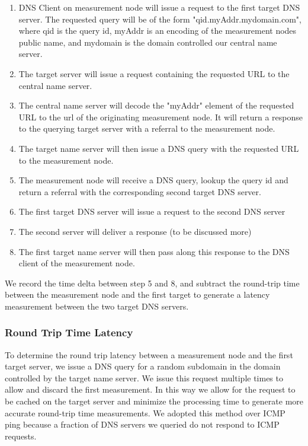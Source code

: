 \begin{enumerate}
\setlength{\itemsep}{1pt}
\setlength{\parskip}{0pt}
\setlength{\parsep}{0pt}
	\item DNS Client on measurement node will issue a request to the first target DNS server. The requested query will be of the form "qid.myAddr.mydomain.com", where qid is the query id, myAddr is an encoding of the measurement nodes public name, and mydomain is the domain controlled our central name server.
	\item The target server will issue a request containing the requested URL to the central name server.
	\item The central name server will decode the "myAddr" element of the requested URL to the url of the originating measurement node. It will return a response to the querying target server with a referral to the measurement node.
	\item The target name server will then issue a DNS query with the requested URL to the measurement node.
	\item The measurement node will receive a DNS query, lookup the query id and return a referral with the corresponding second target DNS server.
	\item The first target DNS server will issue a request to the second DNS server
	\item The second server will deliver a response (to be discussed more)
	\item The first target name server will then pass along this response to the DNS client of the measurement node.
\end{enumerate}

We record the time delta between step 5 and 8, and subtract the round-trip time between the measurement node and the first target to generate a latency measurement between the two target DNS servers.

\subsubsection{Round Trip Time Latency}
To determine the round trip latency between a measurement node and the first target server, we issue a DNS query for a random subdomain in the domain controlled by the target name server. We issue this request multiple times to allow and discard the first measurement. In this way we allow for the request to be cached on the target server and minimize the processing time to generate more accurate round-trip time measurements. We adopted this method over ICMP ping because a fraction of DNS servers we queried do not respond to ICMP requests.

